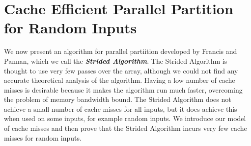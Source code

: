 \documentclass[twocolumn, twoside, 11pt]{article}
\newcommand{\defn}[1]       {{\textit{\textbf{\boldmath #1}}}}
\begin{document}








\section{Cache Efficient Parallel Partition for Random Inputs}
We now present an algorithm for parallel partiition developed by Francis and Pannan, which we call the \defn{Strided Algorithm}.
The Strided Algorithm is thought to use very few passes over the array, although we could not find any accurate theoretical analysis of the algorithm.
Having a low number of cache misses is desirable because it makes the algorithm run much faster, overcoming the problem of memory bandwidth bound.
The Strided Algorithm does not achieve a small number of cache misses for all inputs, but it does achieve this when used on some inputs, for example random inputs.
We introduce our model of cache misses and then prove that the Strided Algorithm incurs very few cache misses for random inputs.
\end{document}
